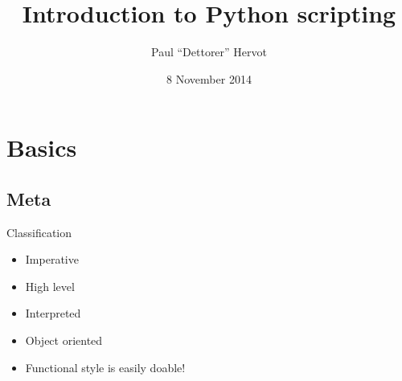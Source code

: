\documentclass[ignorenonframetext,]{beamer}
\title{Introduction to Python scripting}
\author{Paul ``Dettorer'' Hervot}
\date{8 November 2014}
\begin{document}
\frame{\titlepage}

\section{Basics}
\subsection{Meta}

\begin{frame}{Classification}
    \begin{itemize}
        \item Imperative
        \item High level
        \item Interpreted
        \item Object oriented
        \item Functional style is easily doable!
    \end{itemize}
\end{frame}
\end{document}
